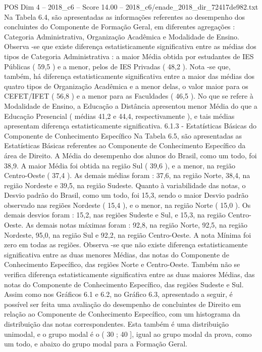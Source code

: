 \begin{textsample}{POS Dim 4 – 2018\_c6 – Score 14.00 – 2018\_c6/enade\_2018\_dir\_72417de982.txt}
Na Tabela 6.4, são apresentadas as informações referentes ao desempenho dos concluintes do Componente de Formação Geral, em diferentes agregações : Categoria Administrativa, Organização Acadêmica e Modalidade de Ensino.
Observa -se que existe diferença estatisticamente significativa entre as médias dos tipos de Categoria Administrativa : a maior Média obtida por estudantes de IES Públicas ( 59,5 ) e a menor, pelos de IES Privadas ( 48,2 ).
Nota -se que, também, há diferença estatisticamente significativa entre a maior das médias dos quatro tipos de Organização Acadêmica e a menor delas, o valor maior para os CEFET/IFET ( 56,8 ) e a menor para as Faculdades ( 46,5 ).
No que se refere à Modalidade de Ensino, a Educação a Distância apresentou menor Média do que a Educação Presencial ( médias 41,2 e 44,4, respectivamente ), e tais médias apresentam diferença estatisticamente significativa. 6.1.3 - Estatísticas Básicas do Componente de Conhecimento Específico Na Tabela 6.5, são apresentadas as Estatísticas Básicas referentes ao Componente de Conhecimento Específico da área de Direito.
A Média do desempenho dos alunos do Brasil, como um todo, foi 38,9.
A maior Média foi obtida na região Sul ( 39,6 ), e a menor, na região Centro-Oeste ( 37,4 ).
As demais médias foram : 37,6, na região Norte, 38,4, na região Nordeste e 39,5, na região Sudeste.
Quanto à variabilidade das notas, o Desvio padrão do Brasil, como um todo, foi 15,3, sendo o maior Desvio padrão observado nas regiões Nordeste ( 15,4 ), e o menor, na região Norte ( 15,0 ).
Os demais desvios foram : 15,2, nas regiões Sudeste e Sul, e 15,3, na região Centro-Oeste.
As demais notas máximas foram : 92,8, na região Norte, 92,5, na região Nordeste, 95,0, na região Sul e 92,2, na região Centro-Oeste.
A nota Mínima foi zero em todas as regiões.
Observa -se que não existe diferença estatisticamente significativa entre as duas menores Médias, das notas do Componente de Conhecimento Específico, das regiões Norte e Centro-Oeste.
Também não se verifica diferença estatisticamente significativa entre as duas maiores Médias, das notas do Componente de Conhecimento Específico, das regiões Sudeste e Sul.
Assim como nos Gráficos 6.1 e 6.2, no Gráfico 6.3, apresentado a seguir, é possível ser feita uma avaliação do desempenho de concluintes de Direito em relação ao Componente de Conhecimento Específico, com um histograma da distribuição das notas correspondentes.
Esta também é uma distribuição unimodal, e o grupo modal é o ( 30 ; 40 ], igual ao grupo modal da prova, como um todo, e abaixo do grupo modal para a Formação Geral.

\end{textsample}
